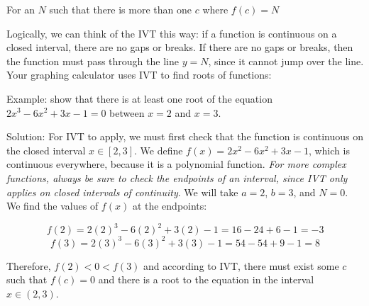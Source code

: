 For an $N$ such that there is more than one $c$ where $f(c) = N$



Logically, we can think of the IVT this way: if a function is continuous on a closed interval, there are no gaps or breaks. If there are no gaps or breaks, then the function must pass through the line $y=N$, since it cannot jump over the line. Your graphing calculator uses IVT to find roots of functions: 

Example: show that there is at least one root of the equation $2x^3-6x^2+3x-1=0$ between $x=2$ and $x=3$.

Solution: For IVT to apply, we must first check that the function is continuous on the closed interval $x \in \left[2, 3\right]$. We define $f(x) = 2x^2-6x^2+3x-1$, which is continuous everywhere, because it is a polynomial function. \textit{For more complex functions, always be sure to check the endpoints of an interval, since IVT only applies on closed intervals of continuity}. We will take $a=2$, $b=3$, and $N=0$. We find the values of $f(x)$ at the endpoints: 

$$f(2)=2(2)^3-6(2)^2+3(2)-1 = 16-24+6-1=-3$$
$$f(3)=2(3)^3-6(3)^2+3(3)-1=54-54+9-1=8$$

Therefore, $f(2)<0<f(3)$ and according to IVT, there must exist some $c$ such that $f(c)=0$ and there is a root to the equation in the interval $x \in \left(2, 3\right)$.

